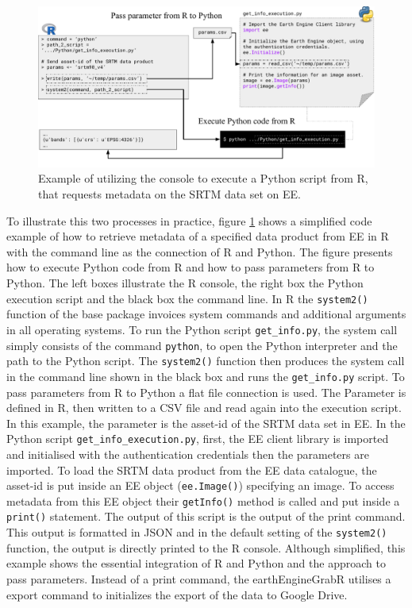 \begin{center}
	\begin{figure}[h]
		\begin{center}
			\includegraphics[width=15cm]{images/concole_connection_big-cropped.pdf}
			\caption{Example of utilizing the console to execute a Python script from R, that requests metadata on the SRTM data set on EE.}
			\label{consoleConnection}			
		\end{center}
	\end{figure}
\end{center}


To illustrate this two processes in practice, figure \ref{consoleConnection} shows a simplified code example of how to retrieve metadata of a specified data product from EE in R with the command line as the connection of R and Python. The figure presents how to execute Python code from R and how to pass parameters from R to Python. The left boxes illustrate the R console, the right box the Python execution script and the black box the command line.
In R the \texttt{system2()} function of the base package invoices system commands and additional arguments in all operating systems. 
To run the Python script \texttt{get\_info.py}, the system call simply consists of the command \texttt{python}, to open the Python interpreter and the path to the Python script. The \texttt{system2()} function then produces the system call in the command line shown in the black box and runs the \texttt{get\_info.py} script. To pass parameters from R to Python a flat file connection is used. The Parameter is defined in R, then written to a CSV file and read again into the execution script. In this example, the parameter is the asset-id of the SRTM data set in EE. 
In the Python script \texttt{get\_info\_execution.py}, first, the EE client library is imported and initialised with the authentication credentials then the parameters are imported. To load the SRTM data product from the EE data catalogue, the asset-id is put inside an EE object (\texttt{ee.Image()}) specifying an image. To access metadata from this EE object their \texttt{getInfo()} method is called and put inside a \texttt{print()} statement. The output of this script is the output of the print command. This output is formatted in JSON and in the default setting of the \texttt{system2()} function, the output is directly printed to the R console. Although simplified, this example shows the essential integration of R and Python and the approach to pass parameters. 
Instead of a print command, the earthEngineGrabR utilises a export command to initializes the export of the data to Google Drive.

